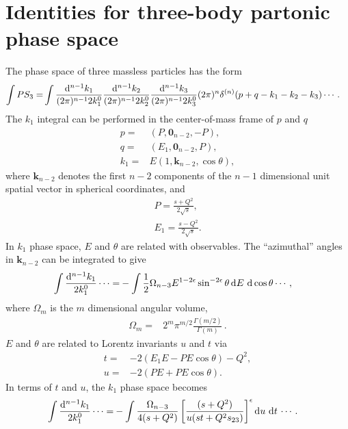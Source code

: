 \documentclass[prd,preprintnumbers,nofootinbib,superscriptaddress,onecolumn,preprint]{revtex4-1}
\newcommand\3[1]{\boldsymbol{#1}}
\begin{document}
\section{Identities for three-body partonic phase space}
\label{a.PS3}

The phase space of three massless particles has the form
\begin{align}
\int PS_3=&\int\frac{\diff{^{n-1}k_1}}{(2\pi)^{n-1}2k_1^0}\frac{\diff{^{n-1}k_2}}{(2\pi)^{n-1}2k_2^0}\frac{\diff{^{n-1}k_3}}{(2\pi)^{n-1}2k_3^0}(2\pi)^n\delta^{(n)}(p+q-k_1-k_2-k_3) \cdots \, .
\end{align}
The $k_1$ integral can be performed in the center-of-mass frame of $p$
and $q$
\begin{align}
p=&(P,\bm{0}_{n-2},-P),\label{eq:pmom} \\
q=&(E_1,\bm{0}_{n-2},P),\label{eq:qmom}
\\
k_1=&E(1,\bm{k}_{n-2},\cos\theta),
\end{align}
where $\bm{k}_{n-2}$ denotes the first $n-2$ components of the $n-1$
dimensional unit spatial vector in spherical coordinates, and
\begin{align}
P=\frac{s+Q^2}{2\sqrt{s}}, \\
E_1=\frac{s-Q^2}{2\sqrt{s}}.
\end{align}
In $k_1$ phase space, $E$ and $\theta$ are related with
observables. The ``azimuthal'' angles
in $\bm{k}_{n-2}$ can be integrated to give
\begin{align}
\int \frac{\diff{^{n-1} k_1}}{2 k_1^0} \cdots 
=& - \int \frac{1}{2} \Omega_{n-3} E^{1-2\epsilon} \sin^{-2\epsilon} \theta
\diff{E} \, \diff{\cos\theta} \cdots \, ,
\label{eq:ps1}
\end{align}
where $\Omega_m$ is the $m$ dimensional angular volume,
\begin{align}
\Omega_m=&2^m\pi^{m/2}\frac{\Gamma (m/2)}{\Gamma (m)} \, .
\end{align}
$E$ and $\theta$ are related to Lorentz invariants $u$ and $t$ via
\begin{align}
t=&-2(E_1 E-PE\cos\theta)-Q^2, \\
u=&-2(PE+PE\cos\theta).
\end{align}
In terms of $t$ and $u$, the $k_1$ phase space becomes
\begin{align}
\int\frac{\diff{^{n-1}k_1}}{2k_1^0} \cdots =&- \int \frac{\Omega_{n-3}}{4(s+Q^2)}
\left[\frac{(s+Q^2)}{u(st+Q^2s_{23})}\right ]^{\epsilon} \diff{u}{} \diff{t}{} \cdots \, .
\label{e.psk1}
\end{align}
\end{document}
